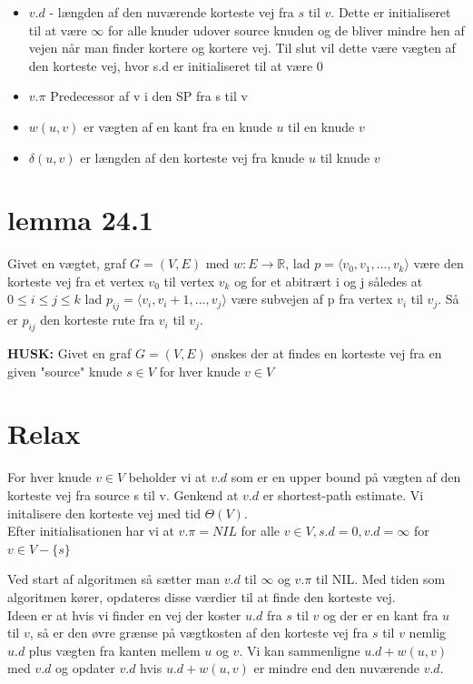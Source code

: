 \documentclass[11pt,a4paper]{report}
\newcommand{\Real}{\mathbb R}
\theoremstyle{plain}
\theoremstyle{definition}
\theoremstyle{remark}
\numberwithin{equation}{section}
\begin{document}
\begin{itemize}
  \item $v.d$ - længden af den nuværende korteste vej fra $s$ til $v$. Dette er initialiseret til at være $\infty$ for alle knuder udover source knuden og de bliver mindre hen af vejen når man finder kortere og kortere vej. Til slut vil dette være vægten af den korteste vej, hvor s.d er initialiseret til at være 0
  \item $v.\pi$ Predecessor af v i den SP fra s til v
  \item $w(u,v)$ er vægten af en kant fra en knude $u$ til en knude $v$
  \item $\delta(u,v)$ er længden af den korteste vej fra knude $u$ til knude $v$
\end{itemize}


\section{lemma 24.1}
Givet en vægtet, graf $G=(V,E)$ med $w : E \rightarrow \Real$, lad $p = \langle v_0, v_1, ... , v_k \rangle$ være den korteste vej fra et vertex $v_0$ til vertex $v_k$ og for et abitrært i og j således at $0 \leq i \leq j \leq k$ lad $p_{ij}= \langle v_i, v_i+1, ... , v_j \rangle$ være subvejen af p fra vertex $v_i$ til $v_j$. Så er $p_{ij}$ den korteste rute fra $v_i$ til $v_j$.

\textbf{HUSK:} Givet en graf $G=(V,E)$ ønskes der at findes en korteste vej fra en given "source" knude $s\in V$ for hver knude $v \in V$

\section{Relax}
For hver knude $v \in V$ beholder vi at $v.d$ som er en upper bound på vægten af den korteste vej fra source s til v. Genkend at $v.d$ er shortest-path estimate. Vi initalisere den korteste vej med tid $\Theta(V)$.\\
Efter initialisationen har vi at $v.\pi = NIL$ for alle $v\in V, s.d = 0, v.d = \infty$ for $v \in V - \{s\}$

Ved start af algoritmen så sætter man $v.d$ til $\infty$ og $v.\pi$ til NIL. Med tiden som algoritmen kører, opdateres disse værdier til at finde den korteste vej.\\
Ideen er at hvis vi finder en vej der koster $u.d$ fra $s$ til $v$ og der er en kant fra $u$ til $v$, så er den øvre grænse på vægtkosten af den korteste vej fra $s$ til $v$ nemlig $u.d$ plus vægten fra kanten mellem $u$ og $v$. Vi kan sammenligne $u.d + w(u,v)$ med $v.d$ og opdater $v.d$ hvis $u.d + w(u,v)$ er mindre end den nuværende $v.d$.
\end{document}
